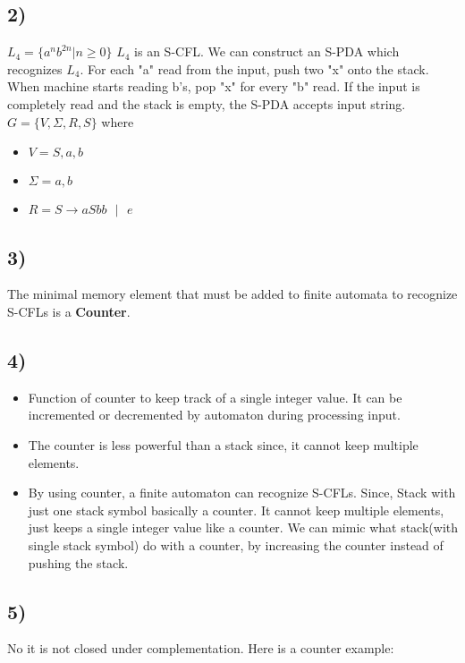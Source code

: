 \documentclass[12pt]{article}
\begin{document}
\subsection*{2)}
$L_4  = \{a^nb^{2n} | n \geq 0 \}$ $L_4$ is an S-CFL. We can construct an S-PDA which recognizes $L_4$. For each "a" read from the input, push two "x" onto the stack. When machine starts reading b's, pop "x" for every "b" read. If the input is completely read and the stack is empty, the S-PDA accepts input string. \\
$G = \{V, \Sigma, R, S\}$ where
\begin{itemize}
    \item $V = {S,a,b}$
    \item $\Sigma = {a,b}$
    \item $R = {S \rightarrow aSbb \mbox{ }| \mbox{ }  e}$
\end{itemize}



\subsection*{3)}
The minimal memory element that must be added to finite automata to recognize S-CFLs is a \textbf{Counter}.

\subsection*{4)}
\begin{itemize}
    \item Function of counter to keep track of a single integer value. It can be incremented or decremented by automaton during processing input. 
    \item The counter is less powerful than a stack since, it cannot keep multiple elements.
    \item By using counter, a finite automaton can recognize S-CFLs. Since, Stack with just one stack symbol basically a counter. It cannot keep multiple elements, just keeps a single integer value like a counter. We can mimic what stack(with single stack symbol) do with a counter, by increasing the counter instead of pushing the stack.
\end{itemize}

\subsection*{5)}
No it is not closed under complementation. Here is a counter example: 
\end{document}
